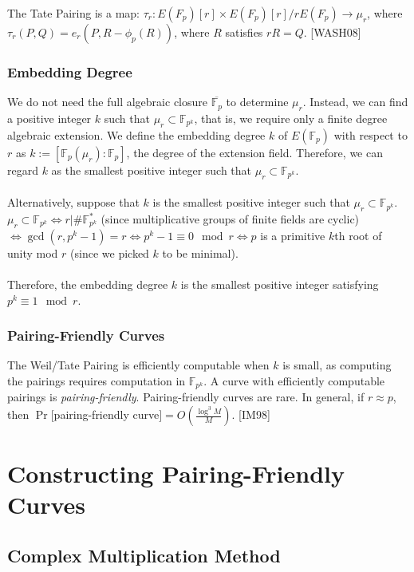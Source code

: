 \documentclass[12pt,twoside]{article}
\begin{document}
\noindent The Tate Pairing is a map: $\tau_r: E(F_p)[r] \times E(F_p)[r]/ rE(F_p) \to \mu_r$, where $\tau_r(P,Q) = e_r(P, R - \phi_p(R))$, where $R$ satisfies $r R = Q$. [WASH08]



 \subsubsection{Embedding Degree}
 
We do not need the full algebraic closure $\overline{\mathbb F_p}$ to determine $\mu_r$. Instead, we can find a positive integer $k$ such that $\mu_r \subset \mathbb F_{p^k}$, that is, we require only a finite degree algebraic extension. We define the embedding degree $k$ of $E(\mathbb F_p)$ with respect to $r$ as $k:= [\mathbb F_p(\mu_r) : \mathbb F_p]$, the degree of the extension field. Therefore, we can regard $k$ as the smallest positive integer such that $\mu_r \subset \mathbb F_{p^k}$.
\\ \\
\noindent Alternatively, suppose that $k$ is the smallest positive integer such that $\mu_r \subset \mathbb F_{p^k}$.  $\mu_r \subset \mathbb F_{p^k} \iff r \Big |  \# \mathbb F^*_{p^k}$ (since multiplicative groups of finite fields are cyclic) $ \iff \gcd(r, p^k-1) = r \iff p^k-1 \equiv 0 \mod r \iff p$ is a primitive $k$th root of unity mod $r$ (since we picked $k$ to be minimal). 
\\ \\
\noindent Therefore, the embedding degree $k$ is the smallest positive integer satisfying $p^k \equiv 1 \mod r$.

\subsubsection{Pairing-Friendly Curves}
The Weil/Tate Pairing is efficiently computable when $k$ is small, as computing the pairings requires computation in $\mathbb F_{p^k}$. A curve with efficiently computable pairings is {\it pairing-friendly}. Pairing-friendly curves are rare. In general, if $r \approx p$, then $\Pr[$pairing-friendly curve$] = O(\frac{\log^3 M}{M})$. [IM98]




\section{Constructing Pairing-Friendly Curves} 

\subsection{Complex Multiplication Method} 
\end{document}
